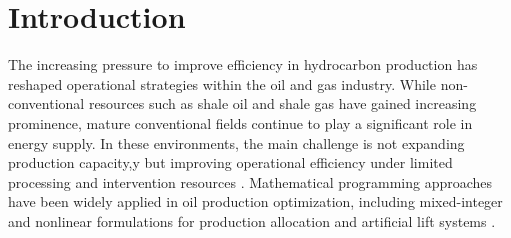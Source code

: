 \section{Introduction}

The increasing pressure to improve efficiency in hydrocarbon production has reshaped operational strategies within the oil and gas industry. While non-conventional resources such as shale oil and shale gas have gained increasing prominence, mature conventional fields continue to play a significant role in energy supply. In these environments, the main challenge is not expanding production capacity,y but improving operational efficiency under limited processing and intervention resources \cite{SIRCAR2021379}. Mathematical programming approaches have been widely applied in oil production optimization, including mixed-integer and nonlinear formulations for production allocation and artificial lift systems  \cite{doi:10.1021/ie034171z}. 

